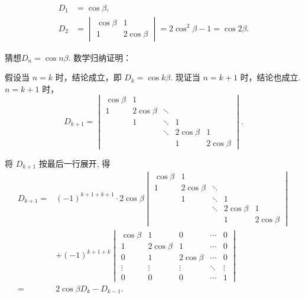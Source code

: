 \begin{solution}
    \begin{align*}
        D_1 & =\cos\beta,                               \\
        D_2 & =\begin{vmatrix}
                   \cos\beta & 1          \\
                   1         & 2\cos\beta
               \end{vmatrix}=2\cos^2\beta-1=\cos2\beta.
    \end{align*}

    猜想$D_n=\cos n\beta$. 数学归纳证明：

    假设当 $n=k$ 时，结论成立，即 $D_{k}=\cos k \beta$. 现证当 $n=k+1$ 时，结论也成立. $ n=k+1 $ 时，
    \[ D_{k+1} = \begin{vmatrix}
            \cos \beta & 1            &        &              &              \\
            1          & 2 \cos \beta & \ddots &              &              \\
                       & 1            & \ddots & 1            &              \\
                       &              & \ddots & 2 \cos \beta & 1            \\
                       &              &        & 1            & 2 \cos \beta
        \end{vmatrix}. \]

    将 $D_{k+1}$ 按最后一行展开, 得
    \begin{align*}
        D_{k+1}={} & (-1)^{k+1+k+1} \cdot 2 \cos \beta
        \begin{vmatrix}
            \cos \beta & 1            &        &              &              \\
            1          & 2 \cos \beta & \ddots &              &              \\
                       & 1            & \ddots & 1            &              \\
                       &              & \ddots & 2 \cos \beta & 1            \\
                       &              &        & 1            & 2 \cos \beta
        \end{vmatrix} \\
                   & +(-1)^{k+1+k}
        \begin{vmatrix}
            \cos \beta & 1            & 0            & \cdots & 0      \\
            1          & 2 \cos \beta & 1            & \cdots & 0      \\
            0          & 1            & 2 \cos \beta & \cdots & 0      \\
            \vdots     & \vdots       & \vdots       & \ddots & \vdots \\
            0          & 0            & 0            & \cdots & 1
        \end{vmatrix}       \\
        ={}        & 2\cos\beta D_k-D_{k-1}.
    \end{align*}


\end{solution}
